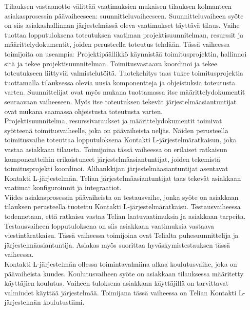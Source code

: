 \documentclass[finnish,12pt,a4paper,pdftex]{article}
\begin{document}
Tilauksen vastaanotto välittää vaatimuksien mukaisen tilauksen kolmanteen asiakasprosessin päävaiheeseen: suunnitteluvaiheeseen. Suunnitteluvaiheen syöte on siis asiakashallinnan järjestelmässä oleva vaatimukset täyttävä tilaus. Vaihe tuottaa lopputuloksena toteutuksen vaatiman projektisuunnitelman, resurssit ja määrittelydokumentit, joiden perusteella toteutus tehdään. Tässä vaiheessa toimijoita on useampia: Projektipäällikkö käynnistää toimitusprojektin, hallinnoi sitä ja tekee projektisuunnitelman. Toimitusvastaava koordinoi ja tekee toteutukseen liittyviä valmistelutöitä. Tuotekehitys taas tukee toimitusprojektia tuottamalla tilauksessa olevia uusia komponentteja ja ohjeistuksia toteutusta varten. Suunnittelijat ovat myös mukana tuottamassa itse määrittelydokumentit seuraavaan vaiheeseen. Myös itse toteutuksen tekevät järjestelmäasiantuntijat ovat mukana saamassa ohjeistusta toteutusta varten.\\

Projektisuunnitelma, resurssivaraukset ja määrittelydokumentit toimivat syötteenä toimitusvaiheelle, joka on päävaiheista neljäs. Näiden perusteella toimitusvaihe toteuttaa lopputuloksena Kontakti L-järjestelmäratkaisun, joka vastaa asiakkaan tilausta. Toimijoina tässä vaiheessa on erilaiset ratkaisun komponentteihin erikoistuneet järjestelmäasiantuntijat, joiden tekemistä toimitusprojekti koordinoi. Alihankkijan järjestelmäasiantuntijat asentavat Kontakti L-järjestelmän. Telian järjestelmäasiantuntijat taas tekevät asiakkaan vaatimat konfiguroinnit ja integraatiot. \\

Viides asiakasprosessin päävaiheista on testausvaihe, jonka syöte on asiakkaan tilauksen perusteella tuotettu Kontakti L-järjestelmäratkaisu. Testausvaiheessa todennetaan, että ratkaisu vastaa Telian laatuvaatimuksia ja asiakkaan tarpeita. Testausvaiheen lopputuloksena on siis asiakkaan vaatimuksia vastaava viestintäratkaisu. Tässä vaiheessa toimijoina ovat Telialta puhesuunnittelija ja järjestelmäasiantuntija. Asiakas myös suorittaa hyväskymistestauksen tässä vaiheessa.\\

Kontakti L-järjestelmän ollessa toimintavalmiina alkaa koulutusvaihe, joka on päävaiheista kuudes. Koulutusvaiheen syöte on asiakkaan tilauksessa määritetty käyttäjien koulutus. Vaiheen tuloksena asiakkaan käyttäjillä on tarvittavat valmiudet käyttää järjestelmää. Toimijana tässä vaiheessa on Telian Kontakti L-järjestelmän koulutustiimi.\\
\end{document}
